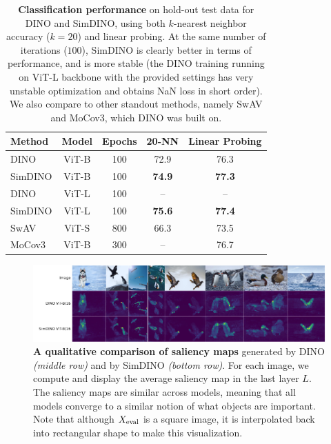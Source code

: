 \documentclass[../../book-main.tex]{subfiles}
\begin{document}
\begin{table}
    \centering
    \begin{tabular}{@{}lcccc@{}} %
        \toprule
        Method & Model & Epochs & 20-NN & Linear Probing 
        \\
        \midrule 
        DINO & ViT-B & 100 & 72.9 & 76.3 \\
        SimDINO & ViT-B & 100 & \bf 74.9 & \bf 77.3 \\
        DINO & ViT-L & 100 & -- & -- \\
        SimDINO & ViT-L & 100 & \bf 75.6 & \bf 77.4 \\
        \midrule
        \color{gray} SwAV & \color{gray} ViT-S & \color{gray} 800 & \color{gray} 66.3 & \color{gray} 73.5 \\
        \color{gray} MoCov3 & \color{gray} ViT-B & \color{gray} 300  & \color{gray} -- & \color{gray} 76.7 \\
        \bottomrule
    \end{tabular}
    \caption{\small\textbf{Classification performance} on hold-out test data for DINO and SimDINO, using both \(k\)-nearest neighbor accuracy (\(k = 20\)) and linear probing. At the same number of iterations (\(100\)), SimDINO is clearly better in terms of performance, and is more stable (the DINO training running on ViT-L backbone with the provided settings has very unstable optimization and obtains NaN loss in short order). We also compare to other standout methods, namely SwAV and MoCov3, which DINO was built on.}
    \label{tab:dino_imagenet_linear_probing}
\end{table}

\begin{figure}
    \centering 
    \includegraphics[width=\textwidth]{chapters/chapter7/figs/dino_attention_maps.png}
    \caption{\small\textbf{A qualitative comparison of saliency maps} generated by DINO \textit{(middle row)} and by SimDINO \textit{(bottom row)}. For each image, we compute and display the average saliency map in the last layer \(L\). The saliency maps are similar across models, meaning that all models converge to a similar notion of what objects are important. Note that although \(X_{\mathrm{eval}}\) is a square image, it is interpolated back into rectangular shape to make this visualization.}
    \label{fig:dino_attention_maps_saliency}
\end{figure}
\end{document}
